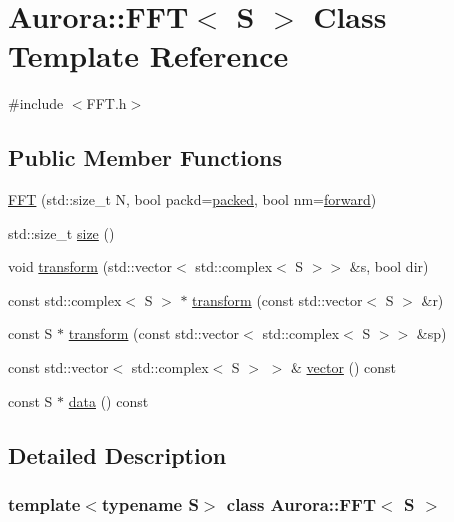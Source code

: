 \hypertarget{class_aurora_1_1_f_f_t}{}\section{Aurora\+:\+:F\+FT$<$ S $>$ Class Template Reference}
\label{class_aurora_1_1_f_f_t}


{\ttfamily \#include $<$F\+F\+T.\+h$>$}

\subsection*{Public Member Functions}
\begin{DoxyCompactItemize}
\item 
\hyperlink{class_aurora_1_1_f_f_t_a358d44bb84dac04a3f6ab13aefdceaf4}{F\+FT} (std\+::size\+\_\+t N, bool packd=\hyperlink{namespace_aurora_a3e70ffc9ea5c526dcd66b1b14e43f175}{packed}, bool nm=\hyperlink{namespace_aurora_a20b1bd3f1b34b8676e26d07718dac352}{forward})
\item 
std\+::size\+\_\+t \hyperlink{class_aurora_1_1_f_f_t_ad0149c60672d3f4e64850dde22f5b163}{size} ()
\item 
void \hyperlink{class_aurora_1_1_f_f_t_a8325de64c8b9f208ed0bc8db3f74e4c7}{transform} (std\+::vector$<$ std\+::complex$<$ S $>$$>$ \&s, bool dir)
\item 
const std\+::complex$<$ S $>$ $\ast$ \hyperlink{class_aurora_1_1_f_f_t_a51ed1e25953c12b7f4cc145d19ee5cd8}{transform} (const std\+::vector$<$ S $>$ \&r)
\item 
const S $\ast$ \hyperlink{class_aurora_1_1_f_f_t_a9331bca89f3782409a7587611f1e4bab}{transform} (const std\+::vector$<$ std\+::complex$<$ S $>$$>$ \&sp)
\item 
const std\+::vector$<$ std\+::complex$<$ S $>$ $>$ \& \hyperlink{class_aurora_1_1_f_f_t_a67003935e240d8b4cf858430f6063913}{vector} () const
\item 
const S $\ast$ \hyperlink{class_aurora_1_1_f_f_t_a7462e77c06228475f0f491d7a25d7bba}{data} () const
\end{DoxyCompactItemize}


\subsection{Detailed Description}
\subsubsection*{template$<$typename S$>$\newline
class Aurora\+::\+F\+F\+T$<$ S $>$}

